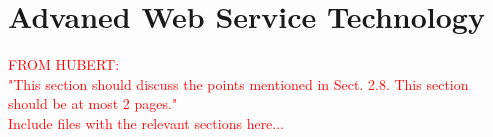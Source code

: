 \chapter{Advaned Web Service Technology}
\textcolor{red}{FROM HUBERT:\\
"This section should discuss the points mentioned in Sect. 2.8. This section should be at most 2 pages."\\
Include files with the relevant sections here...}
